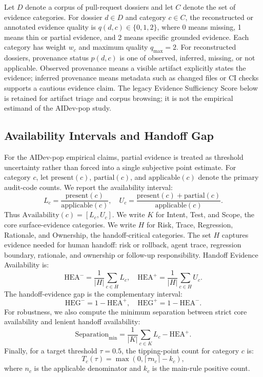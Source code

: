 \documentclass[10pt,conference]{IEEEtran}
\begin{document}
Let $D$ denote a corpus of pull-request dossiers and let $C$ denote the set of evidence categories.
For dossier $d \in D$ and category $c \in C$, the reconstructed or annotated evidence quality is
$q(d,c) \in \{0,1,2\}$, where 0 means missing, 1 means thin or partial evidence, and 2 means specific grounded evidence.
Each category has weight $w_c$ and maximum quality $q_{\max}=2$.
For reconstructed dossiers, provenance status $p(d,c)$ is one of observed, inferred, missing, or not applicable.
Observed provenance means a visible artifact explicitly states the evidence; inferred provenance means metadata such as changed files or CI checks supports a cautious evidence claim.
The legacy Evidence Sufficiency Score below is retained for artifact triage and corpus browsing; it is not the empirical estimand of the AIDev-pop study.

\subsection{Availability Intervals and Handoff Gap}

For the AIDev-pop empirical claims, partial evidence is treated as threshold uncertainty rather than forced into a single subjective point estimate.
For category $c$, let $\mathrm{present}(c)$, $\mathrm{partial}(c)$, and $\mathrm{applicable}(c)$ denote the primary audit-code counts.
We report the availability interval:
\begin{equation}
L_c=\frac{\mathrm{present}(c)}{\mathrm{applicable}(c)},\quad
U_c=\frac{\mathrm{present}(c)+\mathrm{partial}(c)}
{\mathrm{applicable}(c)}.
\end{equation}
Thus $\mathrm{Availability}(c)=[L_c,U_c]$.
We write $K$ for Intent, Test, and Scope, the core surface-evidence categories.
We write $H$ for Risk, Trace, Regression, Rationale, and Ownership, the handoff-critical categories.
The set $H$ captures evidence needed for human handoff: risk or rollback, agent trace, regression boundary, rationale, and ownership or follow-up responsibility.
Handoff Evidence Availability is:
\begin{equation}
\mathrm{HEA}^{-}=\frac{1}{|H|}\sum_{c\in H}L_c,\quad
\mathrm{HEA}^{+}=\frac{1}{|H|}\sum_{c\in H}U_c.
\end{equation}
The handoff-evidence gap is the complementary interval:
\begin{equation}
\mathrm{HEG}^{-}=1-\mathrm{HEA}^{+},\quad
\mathrm{HEG}^{+}=1-\mathrm{HEA}^{-}.
\end{equation}
For robustness, we also compute the minimum separation between strict core availability and lenient handoff availability:
\begin{equation}
\mathrm{Separation}_{\min}=\frac{1}{|K|}\sum_{c\in K}L_c-\mathrm{HEA}^{+}.
\end{equation}
Finally, for a target threshold $\tau=0.5$, the tipping-point count for category $c$ is:
\begin{equation}
T_c(\tau)=\max(0,\lceil \tau n_c\rceil-k_c),
\end{equation}
where $n_c$ is the applicable denominator and $k_c$ is the main-rule positive count.
\end{document}
